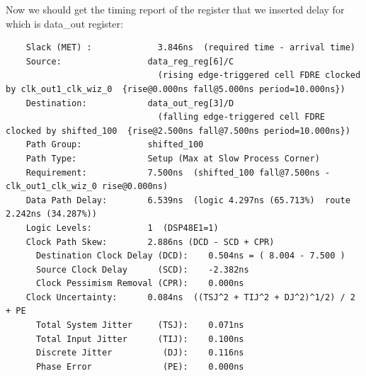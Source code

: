 \documentclass{report}
\begin{document}
Now we should get the timing report of the register that we inserted delay for which is data\_out register:
\begin{verbatim}
    Slack (MET) :             3.846ns  (required time - arrival time)
    Source:                 data_reg_reg[6]/C
                              (rising edge-triggered cell FDRE clocked by clk_out1_clk_wiz_0  {rise@0.000ns fall@5.000ns period=10.000ns})
    Destination:            data_out_reg[3]/D
                              (falling edge-triggered cell FDRE clocked by shifted_100  {rise@2.500ns fall@7.500ns period=10.000ns})
    Path Group:             shifted_100
    Path Type:              Setup (Max at Slow Process Corner)
    Requirement:            7.500ns  (shifted_100 fall@7.500ns - clk_out1_clk_wiz_0 rise@0.000ns)
    Data Path Delay:        6.539ns  (logic 4.297ns (65.713%)  route 2.242ns (34.287%))
    Logic Levels:           1  (DSP48E1=1)
    Clock Path Skew:        2.886ns (DCD - SCD + CPR)
      Destination Clock Delay (DCD):    0.504ns = ( 8.004 - 7.500 ) 
      Source Clock Delay      (SCD):    -2.382ns
      Clock Pessimism Removal (CPR):    0.000ns
    Clock Uncertainty:      0.084ns  ((TSJ^2 + TIJ^2 + DJ^2)^1/2) / 2 + PE
      Total System Jitter     (TSJ):    0.071ns
      Total Input Jitter      (TIJ):    0.100ns
      Discrete Jitter          (DJ):    0.116ns
      Phase Error              (PE):    0.000ns
  

\end{verbatim}
\end{document}

